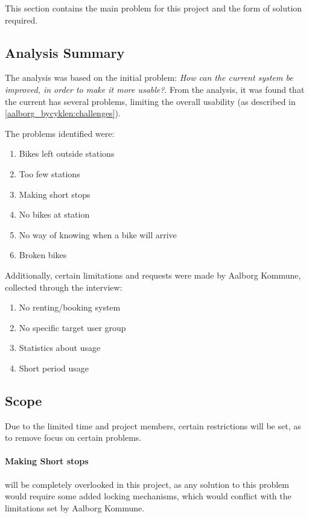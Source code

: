 This section contains the main problem for this project and the form of solution required.

\subsection{Analysis Summary}
The analysis was based on the initial problem: \textit{How can the current \citybike system be improved, in order to make it more usable?}.
From the analysis, it was found that the current \citybike has several problems, limiting the overall usability (as described in \cref{aalborg_bycyklen:challenges}).

The problems identified were:
\begin{enumerate}
\item Bikes left outside stations \label{pr_stations}
\item Too few stations \label{pr_few}
\item Making short stops \label{pr_stops}
\item No bikes at station \label{pr_nobikes}
\item No way of knowing when a bike will arrive \label{pr_arrive}
\item Broken bikes \label{pr_broken}
\end{enumerate}

Additionally, certain limitations and requests were made by Aalborg Kommune, collected through the interview:

\begin{enumerate}
\item No renting/booking system
\item No specific target user group
\item Statistics about usage
\item Short period usage
\end{enumerate}

\subsection{Scope}
Due to the limited time and project members, certain restrictions will be set, as to remove focus on certain problems.

\paragraph{Making Short stops} will be completely overlooked in this project, as any solution to this problem would require some added locking mechanisms, which would conflict with the limitations set by Aalborg Kommune.

